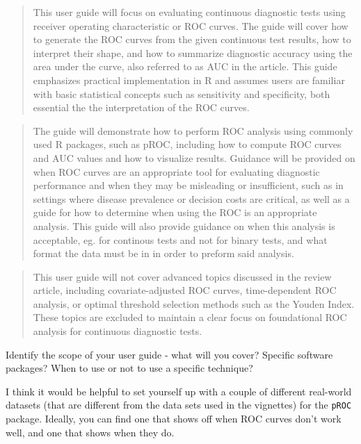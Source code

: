 \documentclass[
  letterpaper,
  DIV=11,
  numbers=noendperiod]{scrreprt}
\begin{document}
\begin{quote}
This user guide will focus on evaluating continuous diagnostic tests
using receiver operating characteristic or ROC curves. The guide will
cover how to generate the ROC curves from the given continuous test
results, how to interpret their shape, and how to summarize diagnostic
accuracy using the area under the curve, also referred to as AUC in the
article. This guide emphasizes practical implementation in R and assumes
users are familiar with basic statistical concepts such as sensitivity
and specificity, both essential the the interpretation of the ROC
curves.
\end{quote}

\begin{quote}
The guide will demonstrate how to perform ROC analysis using commonly
used R packages, such as pROC, including how to compute ROC curves and
AUC values and how to visualize results. Guidance will be provided on
when ROC curves are an appropriate tool for evaluating diagnostic
performance and when they may be misleading or insufficient, such as in
settings where disease prevalence or decision costs are critical, as
well as a guide for how to determine when using the ROC is an
appropriate analysis. This guide will also provide guidance on when this
analysis is acceptable, eg. for continous tests and not for binary
tests, and what format the data must be in in order to preform said
analysis.
\end{quote}

\begin{quote}
This user guide will not cover advanced topics discussed in the review
article, including covariate-adjusted ROC curves, time-dependent ROC
analysis, or optimal threshold selection methods such as the Youden
Index. These topics are excluded to maintain a clear focus on
foundational ROC analysis for continuous diagnostic tests.
\end{quote}

Identify the scope of your user guide - what will you cover? Specific
software packages? When to use or not to use a specific technique?

\begin{tcolorbox}[enhanced jigsaw, opacityback=0, opacitybacktitle=0.6, toptitle=1mm, leftrule=.75mm, colback=white, titlerule=0mm, title=\textcolor{quarto-callout-note-color}{\faInfo}\hspace{0.5em}{Dr.~V's comments}, coltitle=black, colbacktitle=quarto-callout-note-color!10!white, left=2mm, bottomrule=.15mm, bottomtitle=1mm, arc=.35mm, toprule=.15mm, rightrule=.15mm, breakable, colframe=quarto-callout-note-color-frame]

I think it would be helpful to set yourself up with a couple of
different real-world datasets (that are different from the data sets
used in the vignettes) for the \texttt{pROC} package. Ideally, you can
find one that shows off when ROC curves don't work well, and one that
shows when they do.

\end{tcolorbox}
\end{document}
